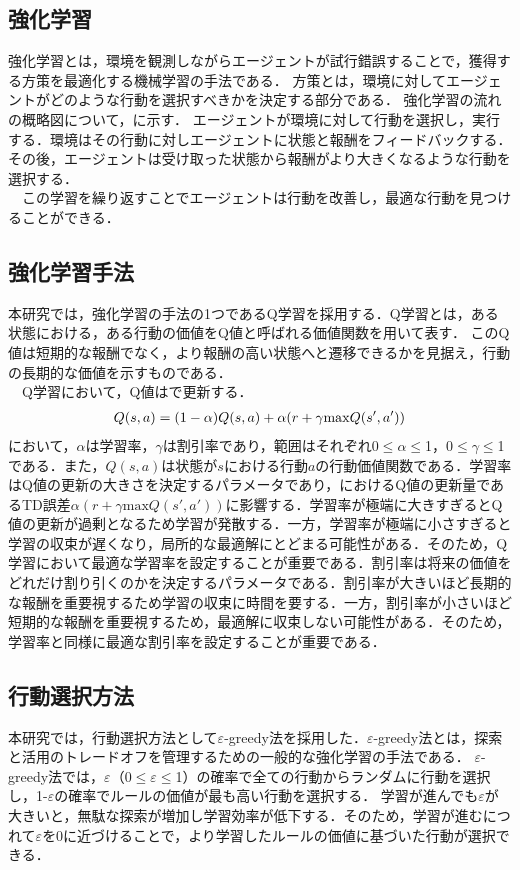 \begin{small}
\subsection{強化学習}
強化学習\cite{rl1}\cite{rl2}とは，環境を観測しながらエージェントが試行錯誤することで，獲得する方策を最適化する機械学習の手法である．
方策とは，環境に対してエージェントがどのような行動を選択すべきかを決定する部分である．
強化学習の流れの概略図について，に示す．
エージェントが環境に対して行動を選択し，実行する．環境はその行動に対しエージェントに状態と報酬をフィードバックする．
その後，エージェントは受け取った状態から報酬がより大きくなるような行動を選択する．\\
　この学習を繰り返すことでエージェントは行動を改善し，最適な行動を見つけることができる．
\subsection{強化学習手法}
本研究では，強化学習の手法の1つであるQ学習\cite{watkins}を採用する．Q学習とは，ある状態における，ある行動の価値をQ値と呼ばれる価値関数を用いて表す．
このQ値は短期的な報酬でなく，より報酬の高い状態へと遷移できるかを見据え，行動の長期的な価値を示すものである．\\
　Q学習において，Q値はで更新する．
\begin{eqnarray}
  \equlabel{1}
  Q(s,a)=(1-\alpha)Q(s,a)+\alpha(r+\gamma \mathrm{max}Q(s',a'))
\end{eqnarray}
において，$\alpha$は学習率，$\gamma$は割引率であり，範囲はそれぞれ0$\leq$$\alpha$$\leq$1，0$\leq$$\gamma$$\leq$1である．また，$Q(s,a)$は状態が$s$における行動$a$の行動価値関数である．学習率はQ値の更新の大きさを決定するパラメータであり，におけるQ値の更新量であるTD誤差$\alpha(r+\gamma \mathrm{max}Q(s',a'))$に影響する．学習率が極端に大きすぎるとQ値の更新が過剰となるため学習が発散する．一方，学習率が極端に小さすぎると学習の収束が遅くなり，局所的な最適解にとどまる可能性がある．そのため，Q学習において最適な学習率を設定することが重要である．割引率は将来の価値をどれだけ割り引くのかを決定するパラメータである．割引率が大きいほど長期的な報酬を重要視するため学習の収束に時間を要する．一方，割引率が小さいほど短期的な報酬を重要視するため，最適解に収束しない可能性がある．そのため，学習率と同様に最適な割引率を設定することが重要である．
\subsection{行動選択方法}
本研究では，行動選択方法として$\varepsilon$-greedy法\cite{greedy}を採用した．$\varepsilon$-greedy法とは，探索と活用のトレードオフを管理するための一般的な強化学習の手法である．
$\varepsilon$-greedy法では，$\varepsilon$（0$\leq$$\varepsilon$$\leq$1）の確率で全ての行動からランダムに行動を選択し，1-$\varepsilon$の確率でルールの価値が最も高い行動を選択する．
学習が進んでも$\varepsilon$が大きいと，無駄な探索が増加し学習効率が低下する．そのため，学習が進むにつれて$\varepsilon$を0に近づけることで，より学習したルールの価値に基づいた行動が選択できる．

\end{small}
